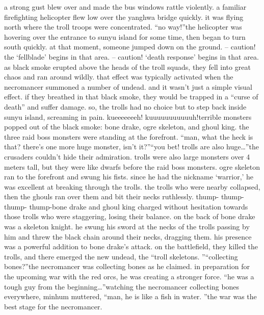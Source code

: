a strong gust blew over and made the bus windows rattle violently.
a familiar firefighting helicopter flew low over the yanghwa bridge quickly.
 it was flying north where the troll troops were concentrated.
“no way!”the helicopter was hovering over the entrance to sunyu island for some time, then began to turn south quickly.
 at that moment, someone jumped down on the ground.
– caution! the ‘fellblade’ begins in that area.
– caution! ‘death response’ begins in that area.
as black smoke erupted above the heads of the troll squads, they fell into great chaos and ran around wildly.
that effect was typically activated when the necromancer summoned a number of undead.
 and it wasn’t just a simple visual effect.
 if they breathed in that black smoke, they would be trapped in a “curse of death” and suffer damage.
 so, the trolls had no choice but to step back inside sunyu island, screaming in pain.
kueeeeeeeh! kuuuuuuuuuuuh!terrible monsters popped out of the black smoke: bone drake, ogre skeleton, and ghoul king.
 the three raid boss monsters were standing at the forefront.
“man, what the heck is that? there’s one more huge monster, isn’t it?”“you bet! trolls are also huge…”the crusaders couldn’t hide their admiration.
 trolls were also large monsters over 4 meters tall, but they were like dwarfs before the raid boss monsters.
ogre skeleton ran to the forefront and swung his fists.
 since he had the nickname ‘warrior,’ he was excellent at breaking through the trolls.
 the trolls who were nearby collapsed, then the ghouls ran over them and bit their necks ruthlessly.
thump- thump- thump- thump-bone drake and ghoul king charged without hesitation towards those trolls who were staggering, losing their balance.
on the back of bone drake was a skeleton knight.
 he swung his sword at the necks of the trolls passing by him and threw the black chain around their necks, dragging them.
 his presence was a powerful addition to bone drake’s attack.
on the battlefield, they killed the trolls, and there emerged the new undead, the “troll skeletons.
”“collecting bones?”the necromancer was collecting bones as he claimed.
 in preparation for the upcoming war with the red orcs, he was creating a stronger force.
“he was a tough guy from the beginning…”watching the necromancer collecting bones everywhere, minhum muttered, “man, he is like a fish in water.
”the war was the best stage for the necromancer.


